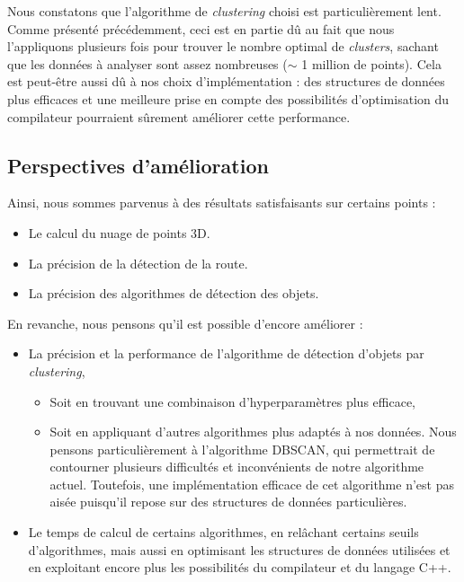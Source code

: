 \documentclass[titlepage,11pt,a4paper]{article}
\begin{document}
\par Nous constatons que l'algorithme de \emph{clustering} choisi est particulièrement lent. Comme présenté précédemment, ceci est en partie dû au fait que nous l'appliquons plusieurs fois pour trouver le nombre optimal de \emph{clusters}, sachant que les données à analyser sont assez nombreuses ($\sim$ 1 million de points). Cela est peut-être aussi dû à nos choix d'implémentation : des structures de données plus efficaces et une meilleure prise en compte des possibilités d'optimisation du compilateur pourraient sûrement améliorer cette performance.


\subsection{Perspectives d'amélioration}
\par Ainsi, nous sommes parvenus à des résultats satisfaisants sur certains points :
\begin{itemize}
\item Le calcul du nuage de points 3D.
\item La précision de la détection de la route.
\item La précision des algorithmes de détection des objets.
\end{itemize}
\par En revanche, nous pensons qu'il est possible d'encore améliorer :
\begin{itemize}
\item La précision et la performance de l'algorithme de détection d'objets par \emph{clustering},
	\begin{itemize}
	\item Soit en trouvant une combinaison d'hyperparamètres plus efficace,
	\item Soit en appliquant d'autres algorithmes plus adaptés à nos données. Nous pensons particulièrement à l'algorithme DBSCAN, qui permettrait de contourner plusieurs difficultés et inconvénients de notre algorithme actuel. Toutefois, une implémentation efficace de cet algorithme n'est pas aisée puisqu'il repose sur des structures de données particulières.
	\end{itemize}
\item Le temps de calcul de certains algorithmes, en relâchant certains seuils d'algorithmes, mais aussi en optimisant les structures de données utilisées et en exploitant encore plus les possibilités du compilateur et du langage C++.
\end{itemize}
\end{document}
